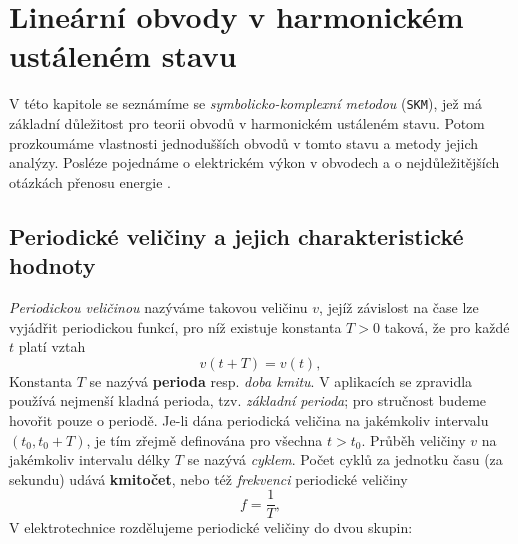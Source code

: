 \chapter[Harmonické obvody]{Lineární obvody v harmonickém ustáleném stavu}
\minitoc
\newpage
  V této kapitole se seznámíme se \emph{symbolicko-komplexní metodou} (\texttt{SKM}), jež má
  základní důležitost pro teorii obvodů v harmonickém ustáleném stavu. Potom prozkoumáme vlastnosti
  jednodušších obvodů v tomto stavu a metody jejich analýzy. Posléze pojednáme o elektrickém výkon
  v obvodech a o nejdůležitějších otázkách přenosu energie \cite[s.~60]{Mayer1975}.
  
  \section{Periodické veličiny a jejich charakteristické hodnoty}
    \emph{Periodickou veličinou} nazýváme takovou veličinu $v$, jejíž závislost na čase lze
    vyjádřit periodickou funkcí, pro níž existuje konstanta $T>0$ taková, že pro každé $t$ platí
    vztah
    \begin{equation}\label{TEO:eq_harm01}
      v(t+T) = v(t),    
    \end{equation}  
    Konstanta $T$ se nazývá \textbf{perioda} resp. \emph{doba kmitu}. V aplikacích se zpravidla
    používá nejmenší kladná perioda, tzv. \emph{základní perioda}; pro stručnost budeme hovořit
    pouze o periodě. Je-li dána periodická veličina na jakémkoliv intervalu $(t_0, t_0+T)$, je tím
    zřejmě definována pro všechna $t>t_0$. Průběh veličiny $v$ na jakémkoliv intervalu délky $T$ se
    nazývá \emph{cyklem}. Počet cyklů za jednotku času (za sekundu) udává \textbf{kmitočet}, nebo
    též \emph{frekvenci} periodické veličiny
    \begin{equation}\label{TEO:eq_harm02}
      f = \frac{1}{T},    
    \end{equation}       
    V elektrotechnice rozdělujeme periodické veličiny do dvou skupin:
          
          
